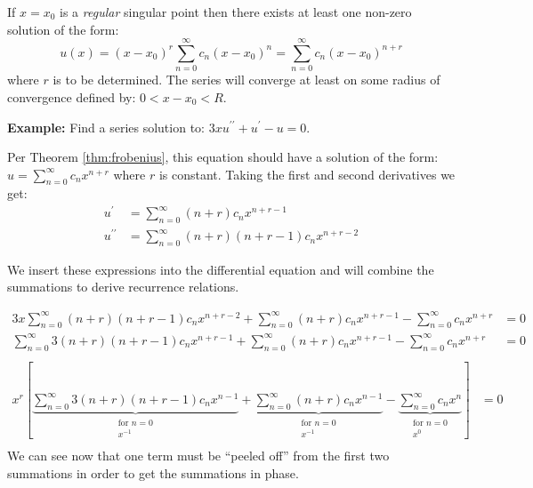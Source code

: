\begin{theorem}
If $x=x_0$ is a \emph{regular} singular point then there exists at least one non-zero solution of the form:
$$u(x) = (x-x_0)^r\sum\limits_{n=0}^{\infty}c_n(x-x_0)^n = \sum\limits_{n=0}^{\infty}c_n(x-x_0)^{n+r}$$
where $r$ is to be determined.  The series will converge at least on some radius of convergence defined by: $0<x-x_0<R$.
\label{thm:frobenius}
\end{theorem}

\vspace{0.5cm}

\noindent\textbf{Example:} Find a series solution to: $3xu^{\prime \prime} + u^{\prime} - u = 0$.

\noindent Per Theorem \ref{thm:frobenius}, this equation should have a solution of the form: $u = \sum_{n=0}^{\infty}c_nx^{n+r}$ where $r$ is constant. Taking the first and second derivatives we get:
\begin{align*}
u^{\prime} &= \sum\limits_{n=0}^{\infty}(n+r)c_nx^{n+r-1} \\
u^{\prime\prime} &= \sum\limits_{n=0}^{\infty}(n+r)(n+r-1)c_nx^{n+r-2}
\end{align*}

\noindent We insert these expressions into the differential equation and will combine the summations to derive recurrence relations.

\begin{align*}
3x\sum\limits_{n=0}^{\infty}(n+r)(n+r-1)c_nx^{n+r-2} + \sum\limits_{n=0}^{\infty}(n+r)c_nx^{n+r-1} - \sum\limits_{n=0}^{\infty}c_nx^{n+r} &= 0 \\
\sum\limits_{n=0}^{\infty}3(n+r)(n+r-1)c_nx^{n+r-1} + \sum\limits_{n=0}^{\infty}(n+r)c_nx^{n+r-1} - \sum\limits_{n=0}^{\infty}c_nx^{n+r} &= 0 \\
\end{align*}
\begin{align*}
x^r\left[\underbrace{\sum\limits_{n=0}^{\infty}3(n+r)(n+r-1)c_nx^{n-1}}_{\substack{\text{for }n=0 \\ x^{-1}}} + \underbrace{\sum\limits_{n=0}^{\infty}(n+r)c_nx^{n-1}}_{\substack{\text{for }n=0 \\ x^{-1}}} - \underbrace{\sum\limits_{n=0}^{\infty}c_nx^n}_{\substack{\text{for }n=0 \\ x^{0}}} \right] &= 0 \\
\end{align*}
We can see now that one term must be ``peeled off'' from the first two summations in order to get the summations in phase. 


